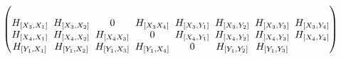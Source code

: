 \begin{gather*}
\begin{pmatrix}
\\
H_{[X_3, X_1]} \hspace{-2.3pt}&\hspace{-2.3pt} H_{[X_3, X_2]} \hspace{-2.3pt}&\hspace{-2.3pt} 0 \hspace{-2.3pt}&\hspace{-2.3pt} H_{[X_3 X_4]} \hspace{-2.3pt}&\hspace{-2.3pt} H_{[X_3, Y_1]} \hspace{-2.3pt}&\hspace{-2.3pt} H_{[X_3, Y_2]} \hspace{-2.3pt}&\hspace{-2.3pt} H_{[X_3, Y_3]} \hspace{-2.3pt}&\hspace{-2.3pt}
H_{[X_3, Y_4]}
\\
H_{[X_4, X_1]} \hspace{-2.3pt}&\hspace{-2.3pt} H_{[X_4, X_2]} \hspace{-2.3pt}&\hspace{-2.3pt} H_{[X_4 X_3]} \hspace{-2.3pt}&\hspace{-2.3pt} 0 \hspace{-2.3pt}&\hspace{-2.3pt} H_{[X_4, Y_1]} \hspace{-2.3pt}&\hspace{-2.3pt} H_{[X_4, Y_2]} \hspace{-2.3pt}&\hspace{-2.3pt} H_{[X_4, Y_3]} \hspace{-2.3pt}&\hspace{-2.3pt}
H_{[X_4, Y_4]}
\\
H_{[Y_1, X_1]} \hspace{-2.3pt}&\hspace{-2.3pt} H_{[Y_1, X_2]} \hspace{-2.3pt}&\hspace{-2.3pt} H_{[Y_1, X_3]} \hspace{-2.3pt}&\hspace{-2.3pt} H_{[Y_1, X_4]} \hspace{-2.3pt}&\hspace{-2.3pt} 0 \hspace{-2.3pt}&\hspace{-2.3pt} H_{[Y_1, Y_2]} \hspace{-2.3pt}&\hspace{-2.3pt} H_{[Y_1, Y_3]} \hspace{-2.3pt}&\hspace{-2.3pt}

\end{pmatrix}
\end{gather*}

